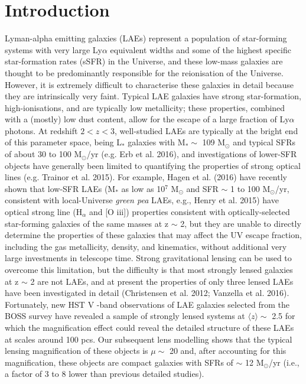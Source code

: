 \documentclass[a4paper,fleqn,usenatbib]{mnras}
\begin{document}
\section{Introduction}
Lyman-alpha emitting galaxies (LAEs) represent a population of star-forming systems with very large Ly$\alpha$ equivalent widths and some of the highest specific star-formation rates (sSFR) in the Universe, and these low-mass galaxies are thought to be predominantly responsible for the reionisation of the Universe. However, it is extremely difficult to characterise these galaxies in detail because they are intrinsically very faint. Typical LAE galaxies have strong star-formation, high-ionisations, and are typically low metallicity; these properties, combined with a (mostly) low dust content, allow for the escape of a large fraction of Ly$\alpha$ photons. At redshift  $2 < z < 3$, well-studied LAEs are typically at the bright end of this parameter space, being  L$_\text{*}$ galaxies with M$_\text{*} \sim$ 109 M$_\odot$ and typical SFRs of about 30 to 100 M$_\odot$/yr (e.g. Erb et al. 2016), and investigations of lower-SFR objects have generally been limited to quantifying the properties of strong optical lines (e.g. Trainor et al. 2015). For example, Hagen et al. (2016) have recently shown that low-SFR LAEs (M$_\text{*}$ as low as 10$^7$ M$_\odot$ and SFR $\sim$ 1 to 100 M$_\odot$/yr, consistent with local-Universe \emph{green pea} LAEs, e.g., Henry et al. 2015) have optical strong line (H$_\alpha$ and [O iii]) properties consistent with optically-selected star-forming galaxies of the same masses at z $\sim$ 2, but they are unable to directly determine the properties of these galaxies that may affect the UV escape fraction, including the gas metallicity, density, and kinematics, without additional very large investments in telescope time.
Strong gravitational lensing can be used to overcome this limitation, but the difficulty is that most strongly lensed galaxies at z $\sim$ 2 are not LAEs, and at present the properties of only three lensed LAEs have been investigated in detail (Christensen et al. 2012; Vanzella et al. 2016). Fortunately, new HST V -band observations of LAE galaxies selected from the BOSS survey have revealed a sample of strongly lensed systems at  $\langle z\rangle \sim$ 2.5 for which the magnification effect could reveal the detailed structure of these LAEs at scales around 100 pcs. Our subsequent lens modelling shows that the typical lensing magnification of these objects is $\mu \sim$ 20 and, after accounting for this magnification, these objects are compact galaxies with SFRs of $\sim$ 12 M$_\odot$/yr (i.e., a factor of 3 to 8 lower than previous detailed studies).
\end{document}
